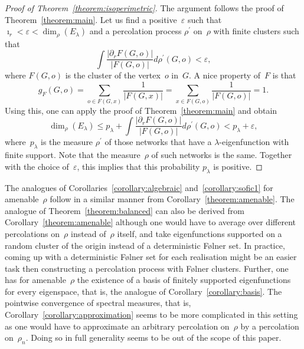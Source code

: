 \documentclass[english]{article}
\theoremstyle{definition}
\newcommand*\eps{\varepsilon}
\begin{document}
\begin{proof}[Proof of Theorem~\ref{theorem:isoperimetric}]
    The argument follows the proof of Theorem~\ref{theorem:main}. Let us find a positive~$\eps$ such that ~$\imath_r <\eps < \dim_\rho (E_\lambda)$ and a percolation process $\rho^\prime$ on~$\rho$ with finite clusters such that 
    $$
    \int \frac{|\partial_r F(G,o)|}{|F(G,o)|} d \rho^\prime(G,o) < \eps,
    $$
    where $F(G,o)$ is the cluster of the vertex~$o$ in~$G$. 
    A nice property of~$F$ is that
    $$
    g_F(G,o) = \sum_{o \in F(G,x)} \frac{1}{|F(G,x)|} = 
    \sum_{x \in F(G,o)} \frac{1}{|F(G,o)|} = 1.
    $$
    Using this, one can apply the proof of Theorem~\ref{theorem:main} and obtain
    \begin{equation*}
        \dim_\rho (E_\lambda) \le p_\lambda + \int\frac{|\partial_r F(G,o)|}{|F(G,o)|} d \rho^\prime(G,o) < p_\lambda + \eps,
    \end{equation*}
    where~$p_\lambda$ is the measure $\rho^\prime$ of those networks that have a $\lambda$-eigenfunction with finite support. Note that the measure~$\rho$ of such networks is the same. Together with the choice of~$\eps$, this implies that this probability $p_\lambda$ is positive. 
\end{proof}

The analogues of Corollaries~\ref{corollary:algebraic} and~\ref{corollary:sofic1} for amenable~$\rho$ follow in a similar manner from Corollary~\ref{theorem:amenable}. The analogue of Theorem~\ref{theorem:balanced} can also be derived from Corollary~\ref{theorem:amenable} although one would have to average over different percolations on~$\rho$ instead of~$\rho$ itself, and take eigenfunctions supported on a random cluster of the origin instead of a deterministic F\o lner set. In practice, coming up with a deterministic F\o lner set for each realisation might be an easier task then constructing a percolation process with F\o lner clusters. Further, one has for amenable~$\rho$ the existence of a basis of finitely supported eigenfunctions for every eigenspace, that is, the analogue of Corollary~\ref{corollary:basis}. The pointwise convergence of spectral measures, that is, Corollary~\ref{corollary:approximation} seems to be more complicated in this setting as one would have to approximate an arbitrary percolation on~$\rho$ by a percolation on~$\rho_n$. Doing so in full generality seems to be out of the scope of this paper.  

\end{document}
